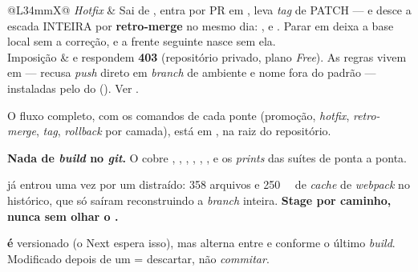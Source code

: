 \begin{tabularx}{\linewidth}{@{}L{34mm}X@{}}
\emph{Hotfix} & Sai de , entra por PR em , leva
  \emph{tag} de PATCH --- e desce a escada INTEIRA por \textbf{retro-merge} no
  mesmo dia: ,  e . Parar em  deixa a
  base local sem a correção, e a frente seguinte nasce sem ela.\\
\zebra Imposição &  e  respondem \textbf{403}
  (repositório privado, plano \emph{Free}). As regras vivem em 
  ---  recusa \emph{push} direto em \emph{branch} de ambiente e
  nome fora do padrão --- instaladas pelo  do 
  (). Ver .\\
\bottomrule
\end{tabularx}

\begin{nota}
O fluxo completo, com os comandos de cada ponte (promoção, \emph{hotfix},
\emph{retro-merge}, \emph{tag}, \emph{rollback} por camada), está em
, na raiz do repositório.
\end{nota}

\begin{atencao}
\textbf{Nada de \emph{build} no \emph{git}.} O  cobre
, , , ,
, ,  e os \emph{prints}
das suítes de ponta a ponta.

 já entrou uma vez por um  distraído:
358 arquivos e \SI{250}{\mega\byte} de \emph{cache} de \emph{webpack} no
histórico, que só saíram reconstruindo a \emph{branch} inteira.
\textbf{Stage por caminho, nunca  sem olhar o .}
\end{atencao}

\begin{nota}
 \textbf{é} versionado (o Next espera isso), mas
alterna entre  e  conforme o último \emph{build}.
Modificado depois de um  = descartar, não \emph{commitar}.
\end{nota}
